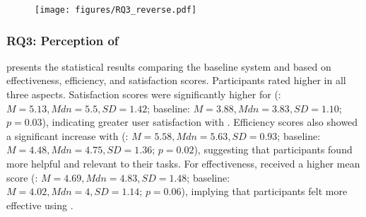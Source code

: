 \begin{figure}[]
  \centering
  \texttt{[image: figures/RQ3\_reverse.pdf]}
  \caption{
  }
  \label{fig:rq3_results}
\end{figure}


\subsubsection{RQ3: Perception of \name{}}
 presents the statistical results comparing the baseline system and \name{} based on effectiveness, efficiency, and satisfaction scores. 
Participants rated \name{} higher in all three aspects. Satisfaction scores were significantly higher for \name{} (\name{}: $M = 5.13, Mdn=5.5, SD = 1.42$; baseline: $M = 3.88, Mdn=3.83, SD = 1.10$; $ p = 0.03$), indicating greater user satisfaction with \name{}. Efficiency scores also showed a significant increase with \name{} (\name{}: $M = 5.58, Mdn=5.63, SD = 0.93$; baseline: $M = 4.48, Mdn=4.75, SD = 1.36$; $p = 0.02$), suggesting that participants found \name{} more helpful and relevant to their tasks. 
For effectiveness, \name{} received a higher mean score (\name{}: $M = 4.69, Mdn=4.83, SD = 1.48$; baseline: $M = 4.02, Mdn=4, SD = 1.14$; $ p = 0.06$), implying that participants felt more effective using \name{}.

